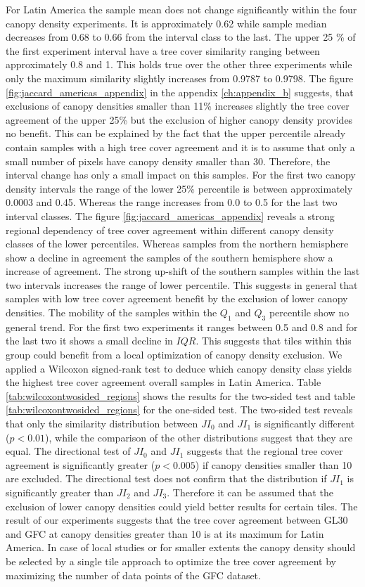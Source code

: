 			For Latin America the sample mean does not change significantly within the four canopy density experiments. It is approximately 0.62 while sample median decreases from 0.68 to 0.66 from the interval class to the last. The upper 25 \% of the first experiment interval have a tree cover similarity ranging between approximately 0.8 and 1. This holds true over the other three experiments while only the maximum similarity slightly increases from 0.9787 to 0.9798. The figure \ref{fig:jaccard_americas_appendix} in the appendix \ref{ch:appendix_b} suggests, that exclusions of canopy densities smaller than 11\% increases slightly the tree cover agreement of the upper 25\% but the exclusion of higher canopy density provides no benefit. This can be explained by the fact that the upper percentile already contain samples with a high tree cover agreement and it is to assume that only a small number of pixels have canopy density smaller than 30. Therefore, the interval change has only a small impact on this samples. For the first two canopy density intervals the range of the lower 25\% percentile is between approximately 0.0003 and 0.45. Whereas the range increases from 0.0 to 0.5 for the last two interval classes. The figure \ref{fig:jaccard_americas_appendix} reveals a strong regional dependency of tree cover agreement within different canopy density classes of the lower percentiles. Whereas samples from the northern hemisphere show a decline in agreement the samples of the southern hemisphere show a increase of agreement. The strong up-shift of the southern samples within the last two intervals increases the range of lower percentile. This suggests in general that samples with low tree cover agreement benefit by the exclusion of lower canopy densities. The mobility of the samples within the $Q_1$ and $Q_3$ percentile show no general trend. For the first two experiments it ranges between 0.5 and 0.8 and for the last two it shows a small decline in $IQR$. This suggests that tiles within this group could benefit from a local optimization of canopy density exclusion. We applied a Wilcoxon signed-rank test to deduce which canopy density class yields the highest tree cover agreement overall samples in Latin America. Table \ref{tab:wilcoxontwosided_regions} shows the results for the two-sided test and table \ref{tab:wilcoxontwosided_regions} for the one-sided test. The two-sided test reveals that only the similarity distribution between $JI_0$ and $JI_1$ is significantly different ($p<0.01$), while the comparison of the other distributions suggest that they are equal. The directional test of $JI_0$ and $JI_1$ suggests that the regional tree cover agreement is significantly greater ($p<0.005$) if canopy densities smaller than 10 are excluded. The directional test does not confirm that the distribution if $JI_1$ is significantly greater than $JI_2$ and $JI_3$. Therefore it can be assumed that the exclusion of lower canopy densities could yield better results for certain tiles. The result of our experiments suggests that the tree cover agreement between \ac{GL30} and \ac{GFC} at canopy densities greater than 10 is at its maximum for Latin America. In case of local studies or for smaller extents the canopy density should be selected by a single tile approach to optimize the tree cover agreement by maximizing the number of data points of the \ac{GFC} dataset.
